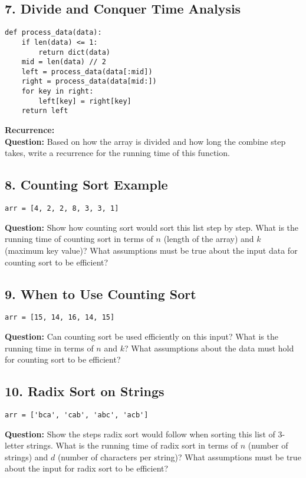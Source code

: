 \documentclass[12pt]{article}
\begin{document}
\vspace{2em}

\subsection*{7. Divide and Conquer Time Analysis}
\begin{lstlisting}
def process_data(data):
    if len(data) <= 1:
        return dict(data)
    mid = len(data) // 2
    left = process_data(data[:mid])
    right = process_data(data[mid:])
    for key in right:
        left[key] = right[key]
    return left
\end{lstlisting}
\textbf{Recurrence:} \underline{\hspace{10cm}} \\
\textbf{Question:} Based on how the array is divided and how long the combine step takes, write a recurrence for the running time of this function.

\vspace{2em}

\subsection*{8. Counting Sort Example}
\begin{lstlisting}
arr = [4, 2, 2, 8, 3, 3, 1]
\end{lstlisting}
\textbf{Question:} Show how counting sort would sort this list step by step. What is the running time of counting sort in terms of $n$ (length of the array) and $k$ (maximum key value)? What assumptions must be true about the input data for counting sort to be efficient?

\vspace{2em}

\subsection*{9. When to Use Counting Sort}
\begin{lstlisting}
arr = [15, 14, 16, 14, 15]
\end{lstlisting}
\textbf{Question:} Can counting sort be used efficiently on this input? What is the running time in terms of $n$ and $k$? What assumptions about the data must hold for counting sort to be efficient?

\vspace{2em}

\subsection*{10. Radix Sort on Strings}
\begin{lstlisting}
arr = ['bca', 'cab', 'abc', 'acb']
\end{lstlisting}
\textbf{Question:} Show the steps radix sort would follow when sorting this list of 3-letter strings. What is the running time of radix sort in terms of $n$ (number of strings) and $d$ (number of characters per string)? What assumptions must be true about the input for radix sort to be efficient?
\end{document}
